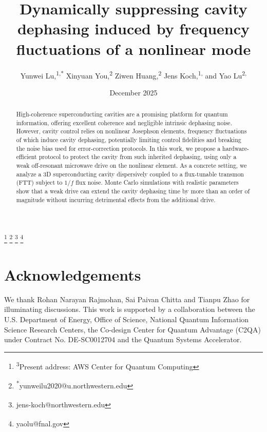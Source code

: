 \documentclass[aps,pra,
    a4paper,
    amsfonts,
    amsmath,
    reprint,
    showkeys,
    nofootinbib,
    twoside
]{revtex4-2}
\begin{document}
\title{Dynamically suppressing cavity dephasing induced by frequency fluctuations of a nonlinear mode}
\author{Yunwei Lu,\textsuperscript{1,*}
Xinyuan You,\textsuperscript{2} Ziwen Huang,\textsuperscript{2}
Jens Koch,\textsuperscript{1,\dag} and Yao Lu\textsuperscript{2,\ddag}}
\thanks{\textsuperscript{3}Present address: AWS Center for Quantum Computing}
\thanks{\textsuperscript{*}yunweilu2020@u.northwestern.edu}
\thanks{\textsuperscript{\dag}jens-koch@northwestern.edu}
\thanks{\textsuperscript{\ddag}yaolu@fnal.gov}
\date{December 2025}

\begin{abstract}
High-coherence superconducting cavities are a promising platform for quantum information, offering excellent coherence and negligible intrinsic dephasing noise. However, cavity control relies on nonlinear Josephson elements, frequency fluctuations of which induce cavity dephasing, potentially limiting control fidelities and breaking the noise bias used for error-correction protocols. In this work, we propose a hardware-efficient protocol to protect the cavity from such inherited dephasing, using only a weak off-resonant microwave drive on the nonlinear element. As a concrete setting, we analyze a 3D superconducting cavity dispersively coupled to a flux-tunable transmon (FTT) subject to \(1/f\) flux noise. Monte Carlo simulations with realistic parameters show that a weak drive can extend the cavity dephasing time by more than an order of magnitude without incurring detrimental effects from the additional drive.
\end{abstract}

\maketitle






\section*{Acknowledgements}
We thank Rohan Narayan Rajmohan, Sai Paivan Chitta and Tianpu Zhao for illuminating discussions.  This work is supported by
a collaboration between the U.S. Department of Energy,
Office of Science, National Quantum Information Science
Research Centers, the Co-design Center for Quantum Advantage (C2QA) under Contract No. DE-SC0012704 and
the Quantum Systems Accelerator.
\appendix












\end{document}
